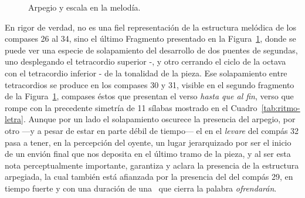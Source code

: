\begin{figure}[H]
\centering
{}

\vspace{0.5cm}

\caption{Arpegio y escala en la melodía.}
\label{fig:arpegio-escala-cuchi}
\end{figure}

\noindent En rigor de verdad,  no es una fiel representación de la estructura melódica de los compases 26 al 34, sino el último Fragmento presentado en la Figura~\ref{fig:arpegio-escala-cuchi}, donde se puede ver una especie de solapamiento del desarrollo de dos puentes de segundas, uno desplegando el tetracordio superior -, y otro cerrando el ciclo de la octava con el tetracordio inferior - de la tonalidad de la pieza. Ese solapamiento entre tetracordios se produce en los compases 30 y 31, visible en el segundo fragmento de la Figura~\ref{fig:arpegio-escala-cuchi}, compases éstos que presentan el verso \emph{hasta que al fin}, verso que rompe con la precedente simetría de 11 sílabas mostrado en el Cuadro~\ref{tab:ritmo-letra}. Aunque por un lado el solapamiento oscurece la presencia del arpegio, por otro ---y a pesar de estar en parte débil de tiempo--- el  en el \emph{levare} del compás 32 pasa a tener, en la percepción del oyente, un lugar jerarquizado por ser el inicio de un envión final que nos deposita en el último tramo de la pieza, y al ser esta nota perceptualmente importante, garantiza y aclara la presencia de la estructura arpegiada, la cual también está afianzada por la presencia del  del compás 29, en tiempo fuerte y con una duración de una \negrap\ que cierra la palabra \emph{ofrendarán}.

